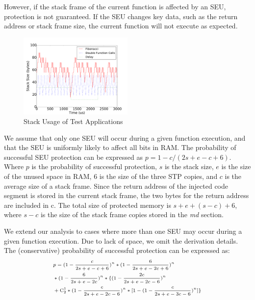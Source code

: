 However, if the stack frame of the current function is affected by an SEU, protection is not guaranteed. If the SEU changes key data, such as the return address or stack frame size, the current function will not execute as expected. 
\begin{figure}
	\vspace{-25pt}
	\begin{center}
		\includegraphics[width=0.5\textwidth]{figures/stacksize_usage_v3.pdf}
	\end{center}
	\vspace{-20pt}
	\caption{Stack Usage of Test Applications}\label{fig:stacksize_usage}
	\vspace{-25pt}
\end{figure}
We assume that only one SEU will occur during a given function execution, and that the SEU is uniformly likely to affect all bits in RAM. The probability of successful SEU protection can be expressed as $p=1-c/(2s+e-c+6)$. Where $p$ is the probability of successful protection, $s$ is the stack size, $e$ is the size of the unused space in RAM, $6$ is the size of the three STP copies, and $c$ is the average size of a stack frame. Since the return address of the injected code segment is stored in the current stack frame, the two bytes for the return address are included in c. The total size of protected memory is $s+e+(s-c)+6$, where $s-c$ is the size of the stack frame copies stored in the \textit{md} section.

We extend our analysis to cases where more than one SEU may occur during a given function execution. Due to lack of space, we omit the derivation details. The (conservative) probability of successful protection can be expressed as:
\vspace{-5pt}
\begin{equation}\label{eq_seu2}
\scriptsize
\begin{split}
&p=(1-\frac{c}{2s+e-c+6})^n*(1-\frac{6}{2s+e-2c+6})^n \\
&*(1-\frac{6}{2s+e-2c})^n*\{(1-\frac{2c}{2s+e-2c-6})^n \\
&+ \mathrm{C}_2^1*(1-\frac{c}{2s+e-2c-6})^n*[1-(1-\frac{c}{2s+e-3c-6})^n]\}
\end{split}
\end{equation}

